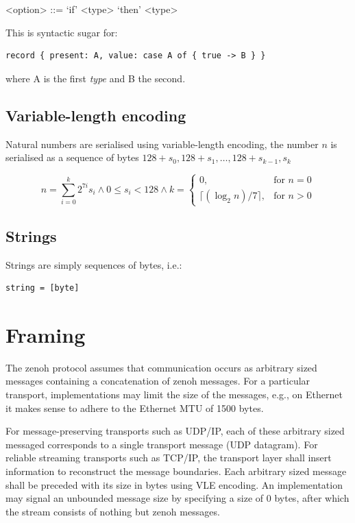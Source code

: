 \documentclass[a4paper,oneside,article]{memoir}
\begin{document}
\begin{grammar}
  <option> ::= `if' <type> `then' <type>
\end{grammar}

This is syntactic sugar for:
\begin{verbatim}
record { present: A, value: case A of { true -> B } }
\end{verbatim}
where A is the first \emph{type} and B the second.

\subsection{Variable-length encoding}

Natural numbers are serialised using variable-length encoding, the number $n$ is serialised as a sequence of bytes $128 + s_0, 128 + s_1, \ldots{}, 128 + s_{k-1}, s_k$

\[
  n = \sum_{i=0}^k 2^{7i}s_i \wedge 0 \leq s_i < 128 \wedge k = \left. \begin{cases}
      0, & \text{for } n = 0 \\
      \lceil (\log_2 n)/7 \rceil, & \text{for } n > 0
      \end{cases} \right.
\]

\subsection{Strings}

Strings are simply sequences of bytes, i.e.:
\begin{verbatim}
string = [byte]
\end{verbatim}

\section{Framing}

The zenoh protocol assumes that communication occurs as arbitrary sized messages containing a
concatenation of zenoh messages.  For a particular transport, implementations may limit the size of
the messages, e.g., on Ethernet it makes sense to adhere to the Ethernet MTU of 1500 bytes.

For message-preserving transports such as UDP/IP, each of these arbitrary sized messaged corresponds
to a single transport message (UDP datagram).  For reliable streaming transports such as TCP/IP, the
transport layer shall insert information to reconstruct the message boundaries. Each arbitrary sized
message shall be preceded with its size in bytes using VLE encoding.  An implementation may signal
an unbounded message size by specifying a size of 0 bytes, after which the stream consists of
nothing but zenoh messages.
\end{document}
